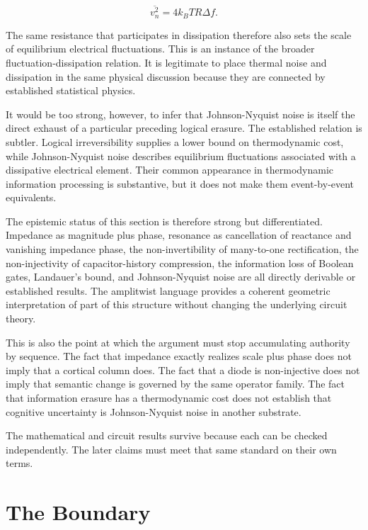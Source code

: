 \documentclass[11pt]{article}
\begin{document}
\begin{equation}
\overline{v_n^2}
=
4k_BTR\Delta f.
\end{equation}

The same resistance that participates in dissipation therefore also sets the scale of equilibrium electrical fluctuations. This is an instance of the broader fluctuation-dissipation relation. It is legitimate to place thermal noise and dissipation in the same physical discussion because they are connected by established statistical physics.

It would be too strong, however, to infer that Johnson-Nyquist noise is itself the direct exhaust of a particular preceding logical erasure. The established relation is subtler. Logical irreversibility supplies a lower bound on thermodynamic cost, while Johnson-Nyquist noise describes equilibrium fluctuations associated with a dissipative electrical element. Their common appearance in thermodynamic information processing is substantive, but it does not make them event-by-event equivalents.

The epistemic status of this section is therefore strong but differentiated. Impedance as magnitude plus phase, resonance as cancellation of reactance and vanishing impedance phase, the non-invertibility of many-to-one rectification, the non-injectivity of capacitor-history compression, the information loss of Boolean gates, Landauer's bound, and Johnson-Nyquist noise are all directly derivable or established results. The amplitwist language provides a coherent geometric interpretation of part of this structure without changing the underlying circuit theory.

This is also the point at which the argument must stop accumulating authority by sequence. The fact that impedance exactly realizes scale plus phase does not imply that a cortical column does. The fact that a diode is non-injective does not imply that semantic change is governed by the same operator family. The fact that information erasure has a thermodynamic cost does not establish that cognitive uncertainty is Johnson-Nyquist noise in another substrate.

The mathematical and circuit results survive because each can be checked independently. The later claims must meet that same standard on their own terms.

\section{The Boundary}
\end{document}
